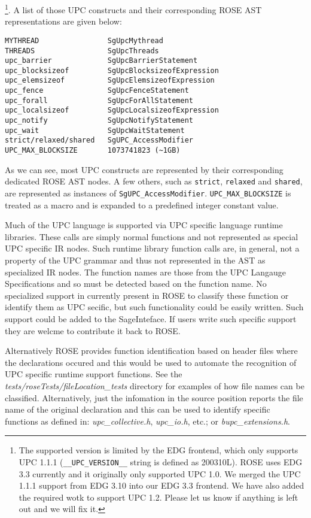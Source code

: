 \footnote{
The supported version is limited by the EDG
frontend, which only supports UPC 1.1.1 (\lstinline{__UPC_VERSION__} string
is defined as 200310L).
ROSE uses EDG 3.3 currently and it originally only supported UPC 1.0.
We merged the UPC 1.1.1 support from EDG 3.10 into our EDG 3.3 frontend. 
We have also added the required wotk to support UPC 1.2. Please let us know if anything is
left out and we will fix it.}.
A list of those UPC constructs and their corresponding ROSE AST representations are given below:
\begin{verbatim}
MYTHREAD                SgUpcMythread
THREADS                 SgUpcThreads
upc_barrier             SgUpcBarrierStatement
upc_blocksizeof         SgUpcBlocksizeofExpression
upc_elemsizeof          SgUpcElemsizeofExpression
upc_fence               SgUpcFenceStatement
upc_forall              SgUpcForAllStatement
upc_localsizeof         SgUpcLocalsizeofExpression
upc_notify              SgUpcNotifyStatement
upc_wait                SgUpcWaitStatement
strict/relaxed/shared   SgUPC_AccessModifier
UPC_MAX_BLOCKSIZE       1073741823 (~1GB)
\end{verbatim}
As we can see, most UPC constructs are represented by their corresponding dedicated ROSE AST nodes. 
A few others, such as \lstinline{strict}, \lstinline{relaxed} and
\lstinline{shared}, are represented as instances of \lstinline{SgUPC_AccessModifier}.
\lstinline{UPC_MAX_BLOCKSIZE} is treated as a macro and is expanded to a predefined integer constant value.

Much of the UPC language is supported via UPC specific language runtime
libraries.  These calls are simply normal functions and not represented 
as special UPC specific IR nodes.  
Such runtime library function calls are, in general, 
not a property of the UPC grammar and thus not represented in the AST 
as specialized IR nodes.
The function names are those from the 
UPC Langauge Specifications and so must be detected based on the function
name.  No specialized support in currently present in ROSE to classify 
these function or identify them as UPC secific, but such functionality
could be easily written. Such support could be added to the SageInteface.
If users write such specific support they are welcme to contribute it 
back to ROSE.

Alternatively ROSE provides function identification based on header files
where the declarations occured and this would be used to automate the recognition of UPC 
specific runtime support functions.  See the {\em tests/roseTests/fileLocation\_tests}
directory for examples of how file names can be classified.  Alternatively,
just the infomation in the source position reports the file name of the
original declaration and this can be used to identify specific functions as 
defined in: {\em upc\_collective.h}, {\em upc\_io.h}, etc.; or {\em bupc\_extensions.h}.

